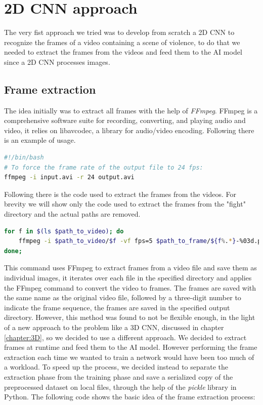 \chapter{2D CNN approach}
The very fist approach we tried was to develop from scratch a 2D CNN to recognize the frames of a video containing a scene of violence, to do that we needed to extract the frames from the videos and feed them to the AI model since a 2D CNN processes images.
\section{Frame extraction}
The idea initially was to extract all frames with the help of \textit{FFmpeg}. FFmpeg is a comprehensive software suite for recording, converting, and playing audio and video, it relies on libavcodec, a library for audio/video encoding. Following there is an example of usage.
\begin{lstlisting}[language=bash, caption={FFmpeg example}, label={lst:FFmpegExample}]
#!/bin/bash
# To force the frame rate of the output file to 24 fps:
ffmpeg -i input.avi -r 24 output.avi

\end{lstlisting}

Following there is the code used to extract the frames from the videos. For brevity we will show only the code used to extract the frames from the "fight" directory and the actual paths are removed.
\begin{lstlisting}[language=bash, caption={Frame extraction}, label={lst:FrameExtraction}]
for f in $(ls $path_to_video); do 
	ffmpeg -i $path_to_video/$f -vf fps=5 $path_to_frame/${f%.*}-%03d.png; 
done;
\end{lstlisting}

This command uses FFmpeg to extract frames from a video file and save them as individual images, it iterates over each file in the specified directory and applies the FFmpeg command to convert the video to frames. The frames are saved with the same name as the original video file, followed by a three-digit number to indicate the frame sequence, the frames are saved in the specified output directory.
However, this method was found to not be flexible enough, in the light of a new approach to the problem like a 3D CNN, discussed in chapter \ref{chapter:3D}, so we decided to use a different approach. We decided to extract frames at runtime and feed them to the AI model. However performing the frame extraction each time we wanted to train a network would have been too much of a workload. To speed up the process, we decided instead to separate the extraction phase from the training phase and save a serialized copy of the preprocessed dataset on local files, through the help of the \textit{pickle} library in Python. The following code shows the basic idea of the frame extraction process:

